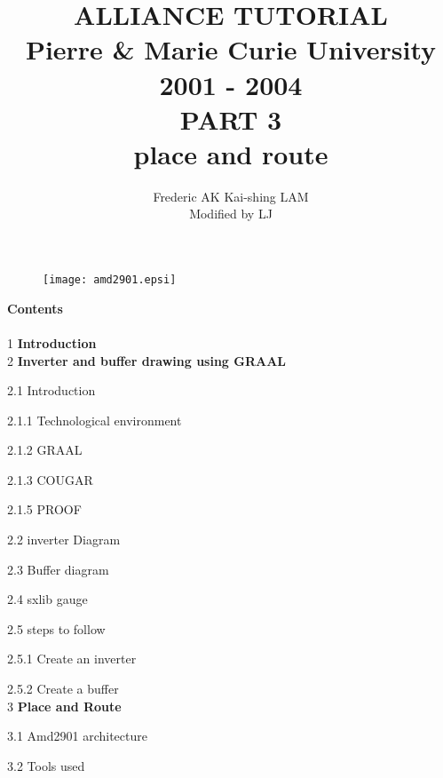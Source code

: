 \documentclass{article}
\begin{document}
\title{
               {\Huge ALLIANCE TUTORIAL \\}
    {\large
               Pierre \& Marie Curie University \\
                          2001 - 2004\\
    }
    \vspace{1cm}
    {\huge
                      PART 3\\
    		place and route
    }
}
\date{}
\author{
Frederic AK\hspace{2cm} Kai-shing LAM\\
Modified by LJ
}

\maketitle
\begin{figure}[H]\centering
  \texttt{[image: amd2901.epsi]}
\end{figure}

\thispagestyle{empty}
\def\myfbox#1{\vspace*{3mm}\fbox{#1}\vspace{3mm}}
\newpage
{\bf Contents}\\
\\
{1} {\bf Introduction}
\\
{2 }{\bf Inverter and buffer drawing using GRAAL}

{2.1} Introduction

\hspace{0.5cm} {2.1.1} Technological environment

\hspace{0.5cm} {2.1.2} GRAAL

\hspace{0.5cm} {2.1.3} COUGAR

\hspace{0.5cm} {2.1.5} PROOF

{2.2} inverter Diagram

{2.3} Buffer diagram 

{2.4} sxlib gauge

{2.5} steps to follow

\hspace{0.5cm}  {2.5.1} Create an inverter

\hspace{0.5cm}  {2.5.2} Create a buffer
\\
{3} {\bf Place and Route}

{3.1} Amd2901 architecture

{3.2} Tools used
\end{document}
